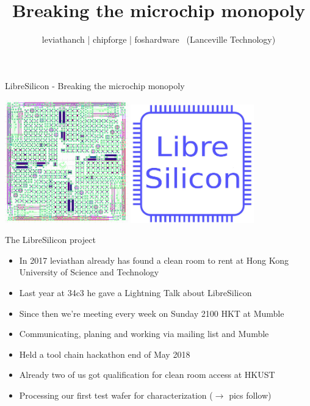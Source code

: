 \documentclass[aspectratio=169]{beamer}
\author{leviathanch | chipforge | foshardware \ (Lanceville Technology)}
\title{Breaking the microchip monopoly}
\begin{document}

\section[Introduction]{}

\begin{frame}{LibreSilicon - Breaking the microchip monopoly}
	\begin{center}
		\includegraphics[width=0.4\textwidth]{images/pearlriver.png}
		\hspace{1cm}
		\includegraphics[width=0.4\textwidth]{images/27c91467-0084-4503-9805-3b53d4d3043e.jpeg}
	\end{center}
\end{frame}

\begin{frame}{The LibreSilicon project}
	\begin{itemize}
		\item In 2017 leviathan already has found a clean room to rent at Hong Kong University of Science and Technology
		\item Last year at 34c3 he gave a Lightning Talk about LibreSilicon
		\item Since then we're meeting every week on Sunday 2100 HKT at Mumble
		\item Communicating, planing and working via mailing list and Mumble
		\item Held a tool chain hackathon end of May 2018
		\item Already two of us got qualification for clean room access at HKUST
		\item Processing our first test wafer for characterization ($\rightarrow$ pics follow)
	\end{itemize}
\end{frame}
\end{document}
